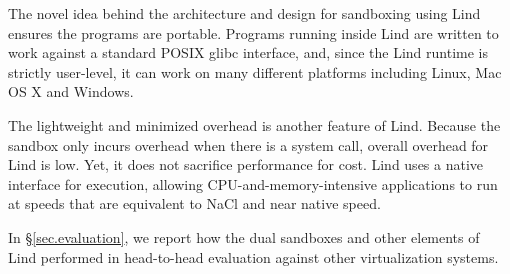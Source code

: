 The novel idea behind the architecture and design for sandboxing using Lind
ensures the programs are portable.
Programs running inside Lind are written to work against  a standard POSIX glibc interface,
and, since the Lind runtime is strictly user-level, it can work on many different platforms
including Linux, Mac OS X and Windows.

The lightweight and minimized overhead is another feature of Lind. Because the sandbox only
 incurs overhead when there is a system call, overall overhead for Lind is low.
 Yet, it does not sacrifice performance for cost.
Lind uses a native interface for execution,
allowing CPU-and-memory-intensive applications to run at speeds that are equivalent
 to NaCl and near native speed.


In \S{\ref{sec.evaluation}}, we report how the dual sandboxes and other elements
of Lind performed in head-to-head evaluation against other virtualization systems.
